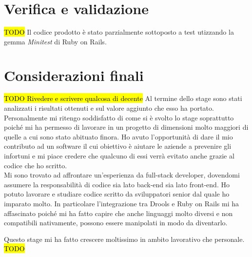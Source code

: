 \newpage
\section{Verifica e validazione}
	\hl{TODO }	
	Il codice prodotto è stato parzialmente sottoposto a test utizzando la gemma \textit{Minitest} di Ruby on Rails.\\
	
	
\newpage
\section{Considerazioni finali}
\hl{TODO Rivedere e scrivere qualcosa di decente}
	Al termine dello stage sono stati analizzati i risultati ottenuti e sul valore aggiunto che esso ha portato.\\
	Personalmente mi ritengo soddisfatto di come si è svolto lo stage soprattutto poiché mi ha permesso di lavorare in un progetto di dimensioni molto maggiori di quelle a cui sono stato abituato finora. Ho avuto l'opportunità di dare il mio contributo ad un software il cui obiettivo è aiutare le aziende a prevenire gli infortuni e mi  piace credere che qualcuno di essi verrà evitato anche grazie al codice che ho scritto.\\
	Mi sono trovato ad affrontare un'esperienza da full-stack developer, dovendomi assumere la responsabilità di codice sia lato back-end sia lato front-end. Ho potuto lavorare e studiare codice scritto da sviluppatori senior dal quale ho imparato molto. In particolare l'integrazione tra Drools e Ruby on Rails mi ha affascinato poiché mi ha fatto capire che anche linguaggi molto diversi e non compatibili nativamente, possono essere manipolati in modo da diventarlo.
	
	Questo stage mi ha fatto crescere moltissimo in ambito lavorativo che personale.
	\hl{TODO }	

























